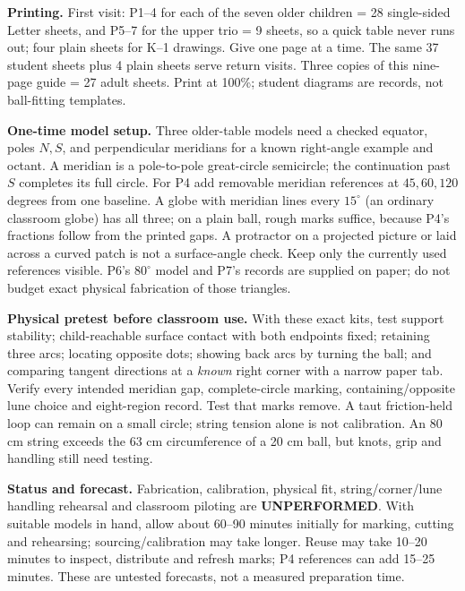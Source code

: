 \documentclass[11pt,letterpaper]{article}
\newcommand{\degc}{^\circ}
\begin{document}
\textbf{Printing.} First visit: P1--4 for each of the seven older children = 28 single-sided Letter sheets, and P5--7 for the upper trio = 9 sheets, so a quick table never runs out; four plain sheets for K--1 drawings. Give one page at a time. The same 37 student sheets plus 4 plain sheets serve return visits. Three copies of this nine-page guide = 27 adult sheets. Print at 100\%; student diagrams are records, not ball-fitting templates.

\textbf{One-time model setup.} Three older-table models need a checked equator, poles $N,S$, and perpendicular meridians for a known right-angle example and octant. A meridian is a pole-to-pole great-circle semicircle; the continuation past $S$ completes its full circle. For P4 add removable meridian references at $45,60,120$ degrees from one baseline. A globe with meridian lines every $15\degc$ (an ordinary classroom globe) has all three; on a plain ball, rough marks suffice, because P4's fractions follow from the printed gaps. A protractor on a projected picture or laid across a curved patch is not a surface-angle check. Keep only the currently used references visible. P6's $80\degc$ model and P7's records are supplied on paper; do not budget exact physical fabrication of those triangles.

\textbf{Physical pretest before classroom use.} With these exact kits, test support stability; child-reachable surface contact with both endpoints fixed; retaining three arcs; locating opposite dots; showing back arcs by turning the ball; and comparing tangent directions at a \emph{known} right corner with a narrow paper tab. Verify every intended meridian gap, complete-circle marking, containing/opposite lune choice and eight-region record. Test that marks remove. A taut friction-held loop can remain on a small circle; string tension alone is not calibration. An 80 cm string exceeds the 63 cm circumference of a 20 cm ball, but knots, grip and handling still need testing.

\textbf{Status and forecast.} Fabrication, calibration, physical fit, string/corner/lune handling rehearsal and classroom piloting are \textbf{UNPERFORMED}. With suitable models in hand, allow about 60--90 minutes initially for marking, cutting and rehearsing; sourcing/calibration may take longer. Reuse may take 10--20 minutes to inspect, distribute and refresh marks; P4 references can add 15--25 minutes. These are untested forecasts, not a measured preparation time.
\end{document}

